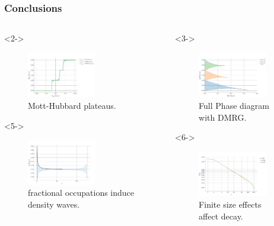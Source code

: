\documentclass[aspectratio=169]{beamer}
\begin{document}
\begin{frame}
  \frametitle{Conclusions}
  \begin{columns}[onlytextwidth]
    \begin{column}{0.33\textwidth}
      \begin{onlyenv}<2->
        \begin{figure}[ht]
          \centering
          \includegraphics[height=2cm, width=\textwidth,keepaspectratio]{../img/BH-3in3-NvsMu.pdf}
          \caption*{Mott-Hubbard plateaus.}
        \end{figure}   
      \end{onlyenv}

      \begin{onlyenv}<5->
        \begin{figure}[ht]
          \centering
          \includegraphics[height=2cm, width=\textwidth,keepaspectratio]{../img/Density-profiles-fractional-density.pdf}
          \caption*{fractional occupations induce density waves.}
        \end{figure}   
      \end{onlyenv}
    \end{column}

    \begin{column}{0.33\textwidth}
      \begin{onlyenv}<3->
        \begin{figure}[ht]
          \centering
          \includegraphics[height=2cm, width=\textwidth,keepaspectratio]{../img/Mott-Lobes.pdf}
          \caption*{Full Phase diagram with DMRG.}
        \end{figure}   
      \end{onlyenv}

      \begin{onlyenv}<6->
        \begin{figure}[ht]
          \centering
          \includegraphics[height=2cm, width=\textwidth,keepaspectratio]{../img/Correlations-lengths.pdf}
          \caption*{Finite size effects affect decay.}
        \end{figure}   
      \end{onlyenv}
    \end{column}


\end{columns}
\end{frame}
\end{document}

